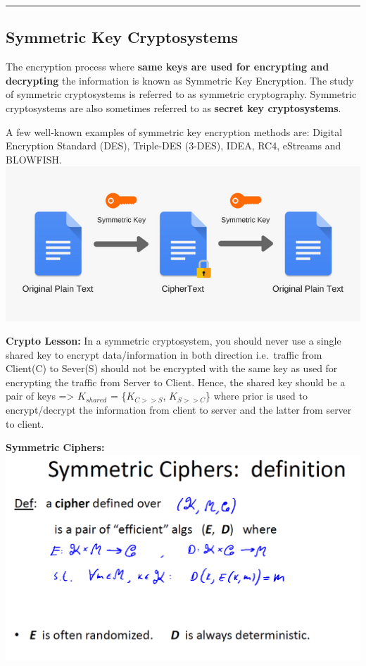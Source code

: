 \documentclass[11pt]{article}
\makeatletter
\def\maxwidth{\ifdim\Gin@nat@width>\linewidth\linewidth
    \else\Gin@nat@width\fi}
\let\Oldincludegraphics\includegraphics
\renewcommand{\includegraphics}[1]{\Oldincludegraphics[width=.8\maxwidth]{#1}}
\makeatother
\begin{document}
\begin{center}\rule{0.5\linewidth}{\linethickness}\end{center}

    \hypertarget{symmetric-key-cryptosystems}{%
\subsection{Symmetric Key
Cryptosystems}\label{symmetric-key-cryptosystems}}

The encryption process where \textbf{same keys are used for encrypting
and decrypting} the information is known as Symmetric Key Encryption.
The study of symmetric cryptosystems is referred to as symmetric
cryptography. Symmetric cryptosystems are also sometimes referred to as
\textbf{secret key cryptosystems}.

A few well-known examples of symmetric key encryption methods are:
Digital Encryption Standard (DES), Triple-DES (3-DES), IDEA, RC4,
eStreams and BLOWFISH.
\includegraphics{./Images/SymmetricEncryption.png}

\textbf{Crypto Lesson:} In a symmetric cryptosystem, you should never
use a single shared key to encrypt data/information in both direction
i.e.~traffic from Client(C) to Sever(S) should not be encrypted with the
same key as used for encrypting the traffic from Server to Client.
Hence, the shared key should be a pair of keys =\textgreater{}
\(K_{shared}\) = \{\(K_{C>>S}\), \(K_{S>>C}\)\} where prior is used to
encrypt/decrypt the information from client to server and the latter
from server to client.

\textbf{Symmetric Ciphers:}
\includegraphics{./Images/SymmetricCipherDef.png}
\end{document}
